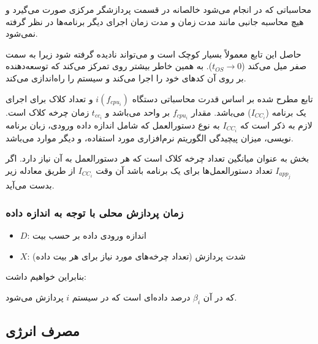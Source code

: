 \documentclass[a4paper]{article}
\begin{document}
محاسباتی که در  انجام می‌شود خالصانه در قسمت پردازشگر مرکزی صورت
می‌گیرد و هیچ محاسبه جانبی مانند مدت زمان  و مدت زمان اجرای دیگر
برنامه‌ها در نظر گرفته نمی‌شود.


حاصل این تابع معمولاً بسیار کوچک است و می‌تواند نادیده گرفته شود زیرا به سمت صفر
میل می‌کند ($t_{OS} \rightarrow 0$). به همین خاطر بیشتر روی 
تمرکز می‌کند که توسعه‌دهنده بر روی آن کد‌های خود را اجرا می‌کند و سیستم 
را راه‌اندازی می‌کند.

تابع مطرح شده بر اساس قدرت محاسباتی دستگاه $i(f_{cpu_i})$ و تعداد کلاک 
برای اجرای یک برنامه ($I_{CC_i}$) می‌باشد. مقدار $f_{cpu_i}$ بر واحد 
می‌باشد و $t_{cc_i}$ زمان چرخه کلاک است. لازم به ذکر است که $I_{CC_i}$ به نوع
دستورالعمل که شامل اندازه داده ورودی، زبان برنامه نویسی، میزان پیچیدگی الگوریتم
نرم‌افزاری مورد استفاده، و دیگر موارد می‌باشد.

بخش  به عنوان میانگین تعداد چرخه کلاک است
که هر دستورالعمل به آن نیاز دارد. اگر $I_{app_j}$ تعداد دستورالعمل‌ها برای یک
برنامه باشد آن وقت $I_{CC_i}$ از طریق معادله زیر بدست می‌آید.


\subsubsection{زمان پردازش محلی با توجه به اندازه داده }


\begin{itemize}
    \item $D$: اندازه ورودی داده بر حسب بیت
    \item $X$: شدت پردازش (تعداد چرخه‌های مورد نیاز برای هر بیت داده)
\end{itemize}

بنابراین خواهیم داشت:


که در آن $\beta_{i}$ درصد داده‌‌ای است که در سیستم $i$ پردازش می‌شود.

\subsection{مصرف انرژی}
\end{document}
